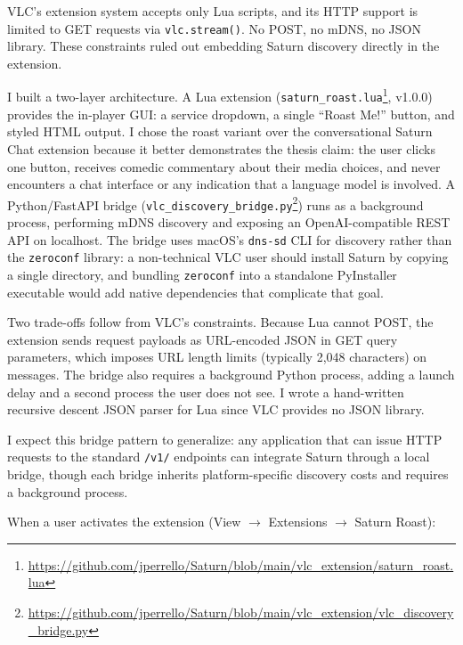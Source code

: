 VLC's extension system accepts only Lua scripts, and its HTTP support is limited to GET requests via \texttt{vlc.stream()}. No POST, no mDNS, no JSON library. These constraints ruled out embedding Saturn discovery directly in the extension.

I built a two-layer architecture.
A Lua extension (\texttt{saturn\_roast.lua}\footnote{\url{https://github.com/jperrello/Saturn/blob/main/vlc_extension/saturn_roast.lua}}, v1.0.0) provides the in-player GUI: a service dropdown, a single ``Roast Me!'' button, and styled HTML output.
I chose the roast variant over the conversational Saturn Chat extension because it better demonstrates the thesis claim: the user clicks one button, receives comedic commentary about their media choices, and never encounters a chat interface or any indication that a language model is involved.
A Python/FastAPI bridge (\texttt{vlc\_discovery\_bridge.py}\footnote{\url{https://github.com/jperrello/Saturn/blob/main/vlc_extension/vlc_discovery_bridge.py}}) runs as a background process, performing mDNS discovery and exposing an OpenAI-compatible REST API on localhost.
The bridge uses macOS's \texttt{dns-sd} CLI for discovery rather than the \texttt{zeroconf} library: a non-technical VLC user should install Saturn by copying a single directory, and bundling \texttt{zeroconf} into a standalone PyInstaller executable would add native dependencies that complicate that goal.

Two trade-offs follow from VLC's constraints.
Because Lua cannot POST, the extension sends request payloads as URL-encoded JSON in GET query parameters, which imposes URL length limits (typically 2,048 characters) on messages.
The bridge also requires a background Python process, adding a launch delay and a second process the user does not see.
I wrote a hand-written recursive descent JSON parser for Lua since VLC provides no JSON library.

I expect this bridge pattern to generalize: any application that can issue HTTP requests to the standard \texttt{/v1/} endpoints can integrate Saturn through a local bridge, though each bridge inherits platform-specific discovery costs and requires a background process.

When a user activates the extension (View $\rightarrow$ Extensions $\rightarrow$ Saturn Roast):

